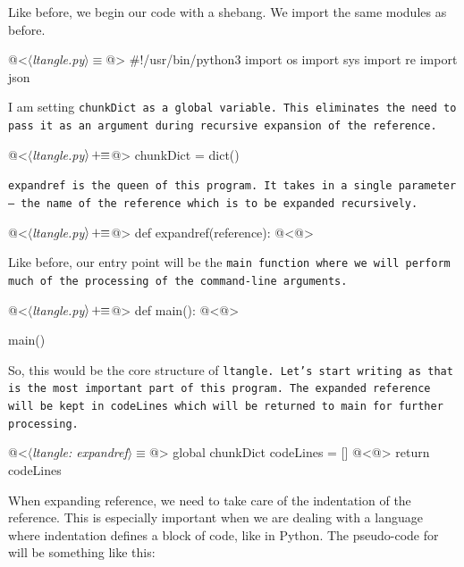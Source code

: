 Like before, we begin our code with a shebang. We import the same modules as before. 

\begin{code}[ltangle.py]
@<$\langle$\textit{ltangle.py}$\rangle\equiv$@>
#!/usr/bin/python3
import os
import sys
import re
import json

\end{code}

I am setting \tt chunkDict \rm as a global variable. This eliminates the need to pass it as an argument during
recursive expansion of the reference.

\begin{oldcode}
@<$\langle$\textit{ltangle.py}$\rangle \thinspace +\!\!\equiv$@>
chunkDict = dict()

\end{oldcode}

\tt expandref \rm is the queen of this program. It takes in a single parameter --- the name of the reference
which is to be expanded recursively.

\begin{oldcode}
@<$\langle$\textit{ltangle.py}$\rangle \thinspace +\!\!\equiv$@>
def expandref(reference):
    @<@>

\end{oldcode}

Like before, our entry point will be the \tt main \rm function where we will perform much of the processing of
the command-line arguments.

\begin{oldcode}
@<$\langle$\textit{ltangle.py}$\rangle \thinspace +\!\!\equiv$@>
def main():
    @<@>

main()
\end{oldcode}

So, this would be the core structure of \tt ltangle\rm. Let's start writing  as that is
the most important part of this program. The expanded reference will be kept in \tt codeLines \rm which will
be returned to \tt main \rm for further processing.\\

\begin{code}
@<$\langle$\textit{ltangle: expandref}$\rangle\equiv$@>
global chunkDict
codeLines = []
@<@>
return codeLines
\end{code}

When expanding reference, we need to take care of the indentation of the reference. This is especially
important when we are dealing with a language where indentation defines a block of code, like in Python. The
pseudo-code for  will be something like this:

